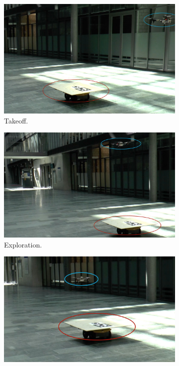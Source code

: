 \begin{figure}[!htbp]
  \centering
   \begin{subfigure}[b]{0.5\textwidth}
        \includegraphics[width=\textwidth]{img/takeoff1.jpg}
        \caption{Takeoff.}
   \end{subfigure}
   \begin{subfigure}[b]{0.5\textwidth}
        \includegraphics[width=\textwidth]{img/exploring1.jpg}
        \caption{Exploration.}
        \label{fig:two}
   \end{subfigure}
   \begin{subfigure}[b]{0.5\textwidth}
        \includegraphics[width=\textwidth]{img/align1.jpg}

\end{subfigure}
\end{figure}
